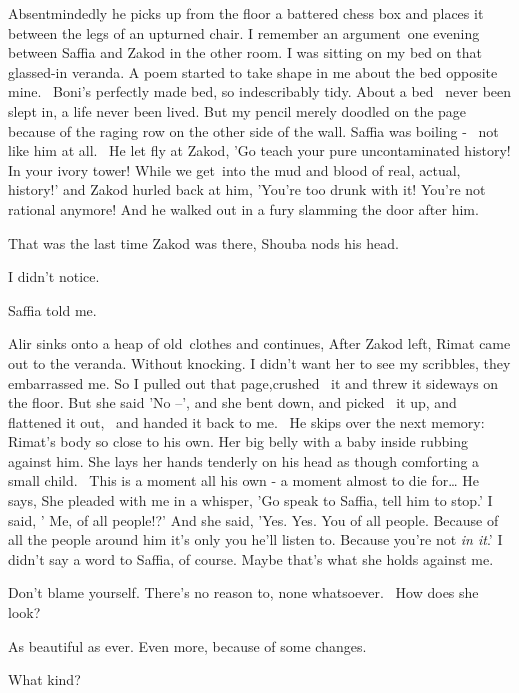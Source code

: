 \documentclass[12pt]{book}
\begin{document}
Absentmindedly he picks up from the floor a battered chess box and places it between the legs of an upturned chair.
{\textquotedbl}I remember an argument~one evening between Saffia and Zakod in the other room. I was sitting on my bed
on that glassed-in veranda. A poem started to take shape in me about the bed opposite mine.~ Boni's perfectly made bed,
so indescribably tidy. About a bed \ never been slept in, a life never been lived. But my pencil merely doodled on the
page because of the raging row on the other side of the wall. Saffia was boiling - \ not like him at all. \ He let fly
at Zakod, 'Go teach your pure uncontaminated history! In your ivory tower! While we get~into the mud and blood of real,
actual, history!' and Zakod hurled back at him, 'You're too drunk with it! You're not rational anymore!{\textquotedbl}
And he walked out in a fury slamming the door after him.

{\textquotedbl}That was the last time Zakod was there,{\textquotedbl} Shouba nods his head.

{\textquotedbl}I didn't notice.{\textquotedbl}

{\textquotedbl}Saffia told me.{\textquotedbl}

Alir sinks onto a heap of old~clothes and continues, {\textquotedbl}After Zakod left, Rimat came out to the veranda.
Without knocking. I didn't want her to see my scribbles, they embarrassed me. So I pulled out that page,crushed \ it
and threw it sideways on the floor. But she said 'No --', and she bent down, and picked \ it up, and flattened it out,
\ and handed it back to me.{\textquotedbl}~ He skips over the next memory: Rimat's body so close to his own. Her big
belly with a baby inside rubbing against him. She lays her hands tenderly on his head as though comforting a small
child. \ This is a moment all his own - a moment almost to die for{\dots} He says, {\textquotedbl}She pleaded with me
in a whisper, 'Go speak to Saffia, tell him to stop.' I said, ' Me, of all people!?' And she said, 'Yes. Yes. You of
all people. Because of all the people around him it's only you he'll listen to. Because you're not \textit{in it}.' I
didn't say a word to Saffia, of course. Maybe that's what she holds against me.{\textquotedbl}

{\textquotedbl}Don't blame yourself. There's no reason to, none whatsoever.~ How does she look?{\textquotedbl}

{\textquotedbl}As beautiful as ever. Even more, because of some changes.{\textquotedbl}

{\textquotedbl}What kind?{\textquotedbl}
\end{document}
